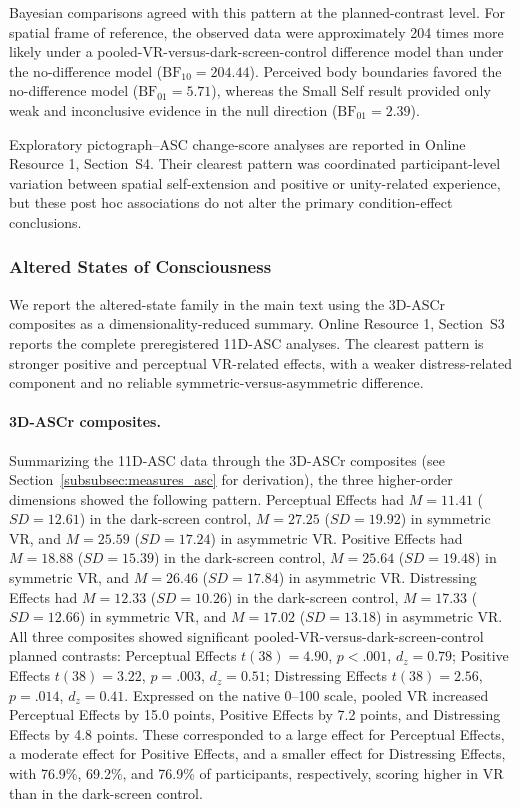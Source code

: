 \documentclass[pdflatex,sn-basic,lineno]{sn-jnl}
\begin{document}
Bayesian comparisons agreed with this pattern at the planned-contrast level. For spatial frame of reference, the observed data were approximately 204 times more likely under a pooled-VR-versus-dark-screen-control difference model than under the no-difference model ($\mathrm{BF}_{10}=204.44$). Perceived body boundaries favored the no-difference model ($\mathrm{BF}_{01}=5.71$), whereas the Small Self result provided only weak and inconclusive evidence in the null direction ($\mathrm{BF}_{01}=2.39$).

Exploratory pictograph--ASC change-score analyses are reported in Online Resource 1, Section~S4. Their clearest pattern was coordinated participant-level variation between spatial self-extension and positive or unity-related experience, but these post hoc associations do not alter the primary condition-effect conclusions.

\subsubsection{Altered States of Consciousness}\label{subsubsec:results_asc}

We report the altered-state family in the main text using the 3D-ASCr composites as a dimensionality-reduced summary. Online Resource 1, Section~S3 reports the complete preregistered 11D-ASC analyses. The clearest pattern is stronger positive and perceptual VR-related effects, with a weaker distress-related component and no reliable symmetric-versus-asymmetric difference.

\paragraph{3D-ASCr composites.}
Summarizing the 11D-ASC data through the 3D-ASCr composites (see Section~\ref{subsubsec:measures_asc} for derivation), the three higher-order dimensions showed the following pattern. Perceptual Effects had $M = 11.41$ ($SD = 12.61$) in the dark-screen control, $M = 27.25$ ($SD = 19.92$) in symmetric VR, and $M = 25.59$ ($SD = 17.24$) in asymmetric VR. Positive Effects had $M = 18.88$ ($SD = 15.39$) in the dark-screen control, $M = 25.64$ ($SD = 19.48$) in symmetric VR, and $M = 26.46$ ($SD = 17.84$) in asymmetric VR. Distressing Effects had $M = 12.33$ ($SD = 10.26$) in the dark-screen control, $M = 17.33$ ($SD = 12.66$) in symmetric VR, and $M = 17.02$ ($SD = 13.18$) in asymmetric VR. All three composites showed significant pooled-VR-versus-dark-screen-control planned contrasts: Perceptual Effects $t(38) = 4.90$, $p < .001$, $d_z = 0.79$; Positive Effects $t(38) = 3.22$, $p = .003$, $d_z = 0.51$; Distressing Effects $t(38) = 2.56$, $p = .014$, $d_z = 0.41$. Expressed on the native 0--100 scale, pooled VR increased Perceptual Effects by 15.0 points, Positive Effects by 7.2 points, and Distressing Effects by 4.8 points. These corresponded to a large effect for Perceptual Effects, a moderate effect for Positive Effects, and a smaller effect for Distressing Effects, with 76.9\%, 69.2\%, and 76.9\% of participants, respectively, scoring higher in VR than in the dark-screen control.
\end{document}
